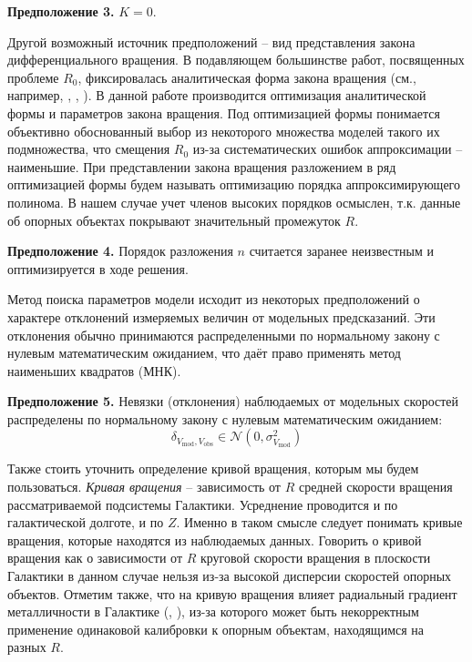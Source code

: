 \documentclass{matmex-diploma-custom}
\begin{document}
\textbf{Предположение 3.}
$K = 0$.

\par Другой возможный источник предположений -- вид представления закона дифференциального вращения. В подавляющем большинстве работ, посвященных проблеме $R_0$, фиксировалась аналитическая форма закона вращения (см., например, \cite{28}, \cite{30}, \cite{31}). В данной работе производится оптимизация аналитической формы и параметров закона вращения. Под оптимизацией формы понимается объективно обоснованный выбор из некоторого множества моделей такого их подмножества, что смещения $R_0$ из-за систематических ошибок аппроксимации -- наименьшие. При представлении закона вращения разложением в ряд оптимизацией формы будем называть оптимизацию порядка аппроксимирующего полинома. В нашем случае учет членов высоких порядков осмыслен, т.к. данные об опорных объектах покрывают значительный промежуток $R$.

\textbf{Предположение 4.}
Порядок разложения $n$ считается заранее неизвестным и оптимизируется в ходе решения.

Метод поиска параметров модели исходит из некоторых предположений о характере отклонений измеряемых величин от модельных предсказаний. Эти отклонения обычно принимаются распределенными по нормальному закону с нулевым математическим ожиданием, что даёт право применять метод наименьших квадратов (МНК).

\textbf{Предположение 5.}
Невязки (отклонения) наблюдаемых от модельных скоростей распределены по нормальному закону с нулевым математическим ожиданием: 
\begin{equation}
        \delta_{V_{\mathrm{mod}}, V_{\mathrm{obs}}} \in \mathcal{N}(0, \sigma^2_{V_{\mathrm{mod}}})
\end{equation}


Также стоить уточнить определение кривой вращения, которым мы будем пользоваться. \textit{Кривая вращения} -- зависимость от $R$ средней скорости вращения рассматриваемой подсистемы Галактики. Усреднение проводится и по галактической долготе, и по $Z$. Именно в таком смысле следует понимать кривые вращения, которые находятся из наблюдаемых данных. Говорить о кривой вращения как о зависимости от $R$ круговой скорости вращения в плоскости Галактики в данном случае нельзя из-за высокой дисперсии скоростей опорных объектов. Отметим также, что на кривую вращения влияет радиальный градиент металличности в Галактике (\cite{13}, \cite{14}), из-за которого может быть некорректным применение одинаковой калибровки к опорным объектам, находящимся на разных $R$. 
\end{document}
